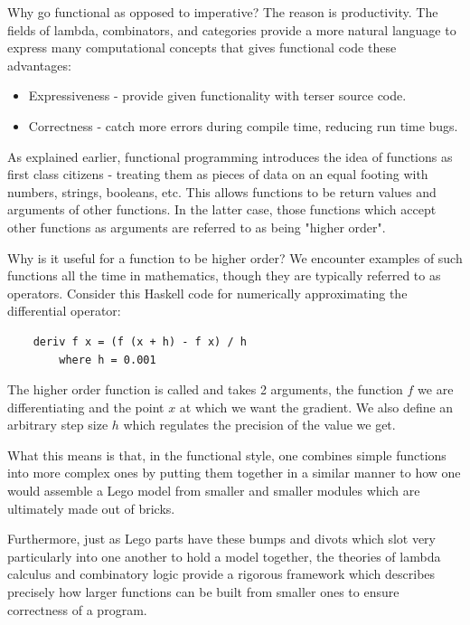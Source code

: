 Why go functional as opposed to imperative? The reason is productivity. The fields of lambda, combinators, and categories provide a more natural language to express many computational concepts that gives functional code these advantages:
\begin{itemize}
    \item Expressiveness - provide given functionality with terser source code.
    \item Correctness - catch more errors during compile time, reducing run time bugs.
\end{itemize}
As explained earlier, functional programming introduces the idea of functions as first class citizens - treating them as pieces of data on an equal footing with numbers, strings, booleans, etc. This allows functions to be return values and arguments of other functions. In the latter case, those functions which accept other functions as arguments are referred to as being "higher order".

Why is it useful for a function to be higher order? We encounter examples of such functions all the time in mathematics, though they are typically referred to as operators. Consider this Haskell code for numerically approximating the differential operator:
\begin{lstlisting}
    deriv f x = (f (x + h) - f x) / h
        where h = 0.001
\end{lstlisting}
The higher order function is called  and takes 2 arguments, the function $f$ we are differentiating and the point $x$ at which we want the gradient. We also define an arbitrary step size $h$ which regulates the precision of the value we get.

What this means is that, in the functional style, one combines simple functions into more complex ones by putting them together in a similar manner to how one would assemble a Lego model from smaller and smaller modules which are ultimately made out of bricks.

Furthermore, just as Lego parts have these bumps and divots which slot very particularly into one another to hold a model together, the theories of lambda calculus and combinatory logic provide a rigorous framework which describes precisely how larger functions can be built from smaller ones to ensure correctness of a program.